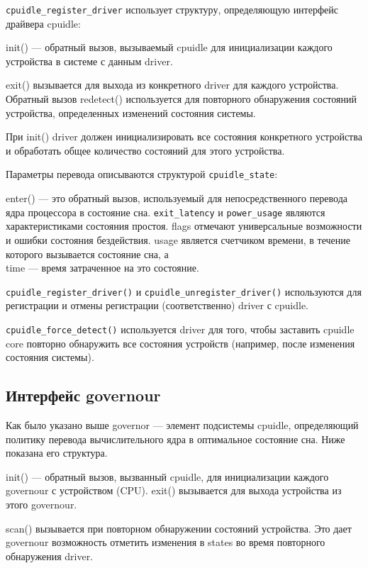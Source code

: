 \documentclass{article}
\begin{document}
\texttt{cpuidle\_register\_driver} использует структуру, определяющую интерфейс драйвера cpuidle:

init() --- обратный вызов, вызываемый cpuidle для инициализации каждого устройства в системе с данным driver.

exit() вызывается для выхода из конкретного driver для каждого устройства. Обратный вызов redetect() используется для повторного обнаружения состояний устройства, определенных изменений состояния системы.

При init() driver должен инициализировать все состояния конкретного устройства и обработать общее количество состояний для этого устройства.

Параметры перевода описываются структурой \texttt{cpuidle\_state}:



enter() --- это обратный вызов, используемый для непосредственного перевода ядра процессора в состояние сна. \texttt{exit\_latency} и \texttt{power\_usage} являются характеристиками состояния простоя. flags отмечают универсальные возможности и ошибки состояния бездействия. usage является счетчиком времени, в течение которого вызывается состояние сна, а \\time --- время затраченное на это состояние.

\texttt{cpuidle\_register\_driver()} и \texttt{cpuidle\_unregister\_driver()} используются для регистрации и отмены регистрации (соответственно) driver с cpuidle.

\texttt{cpuidle\_force\_detect()} используется driver для того, чтобы заставить cpuidle core повторно обнаружить все состояния устройств (например, после изменения состояния системы).

\subsection{Интерфейс governour}

Как было указано выше governor --- элемент подсистемы cpuidle, определяющий политику перевода вычислительного ядра в оптимальное состояние сна. Ниже показана его структура.



init() --- обратный вызов, вызванный cpuidle, для инициализации каждого governour с устройством (CPU). exit() вызывается для выхода устройства из этого governour.

scan() вызывается при повторном обнаружении состояний устройства. Это дает governour возможность отметить изменения в states во время повторного обнаружения driver.
\end{document}
